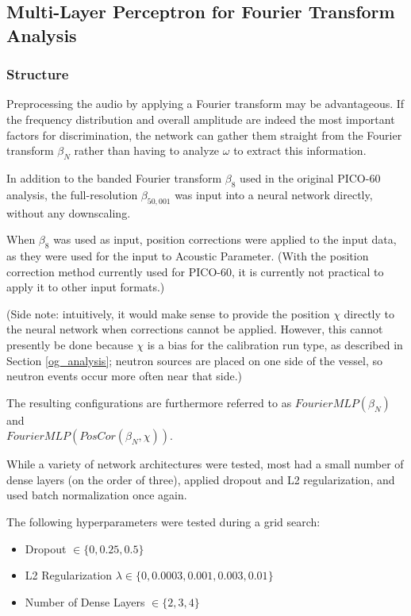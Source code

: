\documentclass[10pt]{article}
\begin{document}
\subsection{Multi-Layer Perceptron for Fourier Transform Analysis} \label{mlp}

\subsubsection{Structure}

Preprocessing the audio by applying a Fourier transform may be advantageous. If the frequency distribution and overall amplitude are indeed the most important factors for discrimination, the network can gather them straight from the Fourier transform $\beta_{N}$ rather than having to analyze $\omega$ to extract this information.

In addition to the banded Fourier transform $\beta_{8}$ used in the original PICO-60 analysis, the full-resolution $\beta_{50,001}$ was input into a neural network directly, without any downscaling.

When $\beta_{8}$ was used as input, position corrections were applied to the input data, as they were used for the input to Acoustic Parameter. (With the position correction method currently used for PICO-60, it is currently not practical to apply it to other input formats.)

(Side note: intuitively, it would make sense to provide the position $\chi$ directly to the neural network when corrections cannot be applied. However, this cannot presently be done because $\chi$ is a bias for the calibration run type, as described in Section \ref{og_analysis}; neutron sources are placed on one side of the vessel, so neutron events occur more often near that side.)

The resulting configurations are furthermore referred to as $FourierMLP(\beta_{N})$ and \\ $FourierMLP(PosCor(\beta_{N}, \chi))$.

While a variety of network architectures were tested, most had a small number of dense layers (on the order of three), applied dropout and L2 regularization, and used batch normalization once again.

The following hyperparameters were tested during a grid search:
\begin{itemize}
    \item Dropout $\in \{0, 0.25, 0.5\}$
    \item L2 Regularization $\lambda \in \{0, 0.0003, 0.001, 0.003, 0.01\}$
    \item Number of Dense Layers $\in \{2, 3, 4\}$
\end{itemize}
\end{document}
